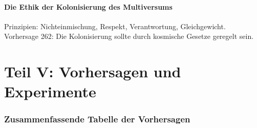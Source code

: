 \documentclass[11pt,a4paper]{article}
\begin{document}
\subsection{Die Ethik der Kolonisierung des Multiversums}
Prinzipien: Nichteinmischung, Respekt, Verantwortung, Gleichgewicht. Vorhersage 262: Die Kolonisierung sollte durch kosmische Gesetze geregelt sein.

\newpage
\part*{Teil V: Vorhersagen und Experimente}

\section{Zusammenfassende Tabelle der Vorhersagen}
\end{document}
